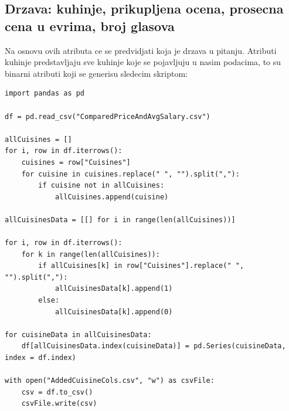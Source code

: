 \documentclass[11pt]{article} %
\begin{document}
\subsection{Drzava: kuhinje, prikupljena ocena, prosecna cena u evrima, broj glasova}
Na osnovu ovih atributa ce se predvidjati koja je drzava u pitanju.
Atributi kuhinje predstavljaju sve kuhinje koje se pojavljuju u nasim podacima, to su binarni atributi koji se generisu sledecim skriptom:

\begin{lstlisting}
import pandas as pd

df = pd.read_csv("ComparedPriceAndAvgSalary.csv")

allCuisines = []
for i, row in df.iterrows():
    cuisines = row["Cuisines"]
    for cuisine in cuisines.replace(" ", "").split(","):
        if cuisine not in allCuisines:
            allCuisines.append(cuisine)
            
allCuisinesData = [[] for i in range(len(allCuisines))]

for i, row in df.iterrows():
    for k in range(len(allCuisines)):
        if allCuisines[k] in row["Cuisines"].replace(" ", "").split(","):
            allCuisinesData[k].append(1)
        else:
            allCuisinesData[k].append(0)
            
for cuisineData in allCuisinesData:
    df[allCuisinesData.index(cuisineData)] = pd.Series(cuisineData, index = df.index)
    
with open("AddedCuisineCols.csv", "w") as csvFile:
    csv = df.to_csv()
    csvFile.write(csv)

\end{lstlisting}
\end{document}
